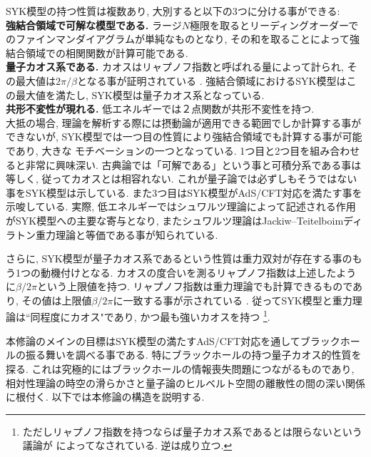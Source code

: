 SYK模型の持つ性質は複数あり, 大別すると以下の3つに分ける事ができる:\\

\textbf{強結合領域で可解な模型である.}
ラージ$N$極限を取るとリーディングオーダーでのファインマンダイアグラムが単純なものとなり, 
その和を取ることによって強結合領域での相関関数が計算可能である. \\

\textbf{量子カオス系である.}
カオスはリャプノフ指数と呼ばれる量によって計られ, 
その最大値は$2\pi / \beta$となる事が証明されている \cite{shenker}. 
強結合領域におけるSYK模型はこの最大値を満たし\cite{maldacena}, 
SYK模型は量子カオス系となっている. \\

\textbf{共形不変性が現れる.}
低エネルギーでは２点関数が共形不変性を持つ. \\

大抵の場合, 理論を解析する際には摂動論が適用できる範囲でしか計算する事ができないが, 
SYK模型では一つ目の性質により強結合領域でも計算する事が可能であり, 大きな
モチベーションの一つとなっている. 
1つ目と2つ目を組み合わせると非常に興味深い. 
古典論では「可解である」という事と可積分系である事は等しく, 従ってカオスとは相容れない\cite{polchinski}. 
これが量子論では必ずしもそうではない事をSYK模型は示している. 
また3つ目はSYK模型がAdS/CFT対応を満たす事を示唆している. 
実際, 低エネルギーではシュワルツ理論によって記述される作用がSYK模型への主要な寄与となり, 
またシュワルツ理論はJackiw--Teitelboimディラトン重力理論と等価である事が知られている.

さらに, SYK模型が量子カオス系であるという性質は重力双対が存在する事のもう1つの動機付けとなる.
カオスの度合いを測るリャプノフ指数は上述したように$\beta / 2\pi$という上限値を持つ.
リャプノフ指数は重力理論でも計算できるものであり, その値は上限値$\beta / 2\pi$に一致する事が示されている
\cite{shenker}.
従ってSYK模型と重力理論は``同程度にカオス"であり, かつ最も強いカオスを持つ
\footnote{ただしリャプノフ指数を持つならば量子カオス系であるとは限らないという議論が\cite{eiki}
によってなされている. 逆は成り立つ.}. 


本修論のメインの目標はSYK模型の満たすAdS/CFT対応を通してブラックホールの振る舞いを調べる事である. 
特にブラックホールの持つ量子カオス的性質を探る. 
これは究極的にはブラックホールの情報喪失問題につながるものであり, 
相対性理論の時空の滑らかさと量子論のヒルベルト空間の離散性の間の深い関係に根付く\cite{stanford_chaos}. 
以下では本修論の構造を説明する. 

